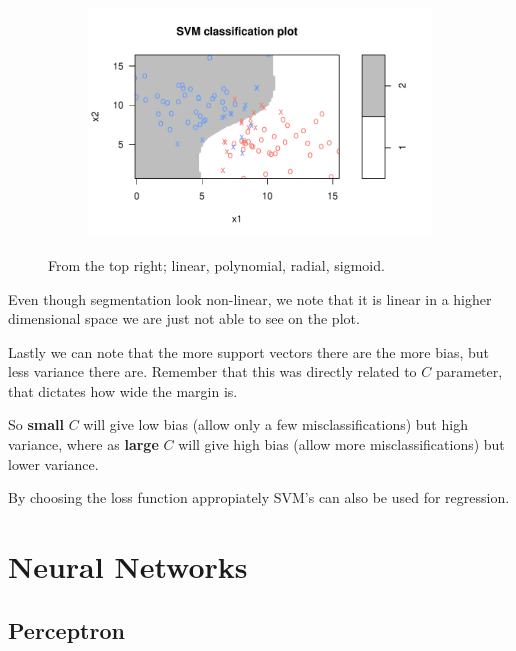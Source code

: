 \documentclass[aspectratio=169,10pt]{beamer}
\begin{document}
\begin{frame}{\secname}{\subsecname}
\begin{figure}
\begin{subfigure}[t]{.45\textwidth}
      \centering
      \includegraphics[width=.65\textwidth]{scripts/output/sigmoid_kernel.pdf}
    \end{subfigure}
    \caption{From the top right; linear, polynomial, radial, sigmoid.}
  \end{figure}
\end{frame}

\begin{frame}{\secname}{\subsecname}
  Even though segmentation look non-linear, we note that it is linear in a higher dimensional space we are just not able to see on the plot.

  Lastly we can note that the more support vectors there are the more bias, but less variance there are.
  Remember that this was directly related to $C$ parameter, that dictates how wide the margin is.

  So \textbf{small} $C$ will give low bias (allow only a few misclassifications) but high variance, where as \textbf{large} $C$ will give high bias (allow more misclassifications) but lower variance.

  By choosing the loss function appropiately SVM's can also be used for regression.
\end{frame}

\section{Neural Networks}

\subsection{Perceptron}
\end{document}
